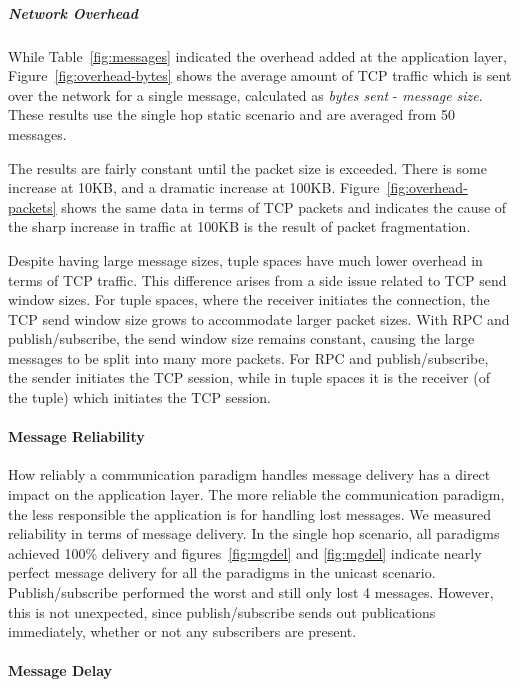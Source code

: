 \subparagraph{Network Overhead}

While Table~\ref{fig:messages} indicated the overhead added at the application layer, Figure~\ref{fig:overhead-bytes} shows the average amount of TCP traffic which is sent over the network for a single message, calculated as \textit{bytes sent} - \textit{message size}. These results use the single hop static scenario and are averaged from 50 messages.

The results are fairly constant until the packet size is exceeded. There is some increase at 10KB, and a dramatic increase at 100KB. Figure~\ref{fig:overhead-packets} shows the same data in terms of TCP packets and indicates the cause of the sharp increase in traffic at 100KB is the result of packet fragmentation.

Despite having large message sizes, tuple spaces have much lower overhead in terms of TCP traffic. This difference arises from a side issue related to TCP send window sizes. For tuple spaces, where the receiver initiates the connection, the TCP send window size grows to accommodate larger packet sizes. With RPC and publish/subscribe, the send window size remains constant, causing the large messages to be split into many more packets. For RPC and publish/subscribe, the sender initiates the TCP session, while in tuple spaces it is the receiver (of the tuple) which initiates the TCP session.

\paragraph{Message Reliability}

How reliably a communication paradigm handles message delivery has a direct impact on the application layer. The more reliable the communication paradigm, the less responsible the application is for handling lost messages. We measured reliability in terms of message delivery. In the single hop scenario, all paradigms achieved 100\% delivery and figures~\ref{fig:mgdel} and \ref{fig:mgdel} indicate nearly perfect message delivery for all the paradigms in the unicast scenario. Publish/subscribe performed the worst and still only lost 4 messages. However, this is not unexpected, since publish/subscribe sends out publications immediately, whether or not any subscribers are present.

\paragraph{Message Delay}

